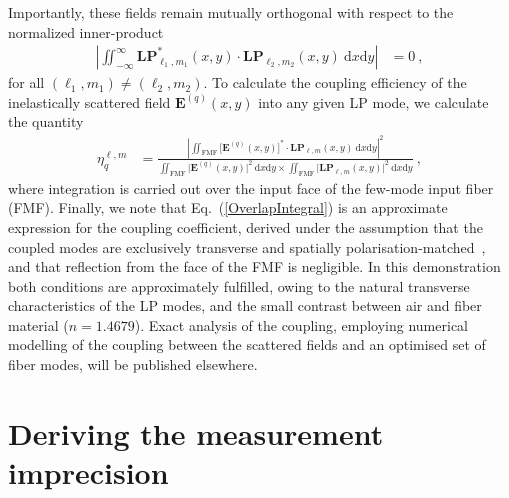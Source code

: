 \documentclass[%
 reprint,
 amsmath,amssymb,
 aps,
pra,
]{revtex4-2}
\begin{document}
Importantly, these fields remain mutually orthogonal with respect to the normalized inner-product
\begin{align}\label{SpatialOverlapIntegral}
    \left|\iint_{-\infty}^{\infty} \textbf{LP}_{\ell_{1}, m_{1}}^{*}(x, y) \cdot \textbf{LP}_{\ell_{2}, m_{2}}(x, y) ~ \mathrm{d}x\mathrm{d}y\right| &= 0 ~ , 
\end{align}
for all $(\ell_{1}, m_{1}) \neq (\ell_{2}, m_{2})$. To calculate the coupling efficiency of the inelastically scattered field $\boldsymbol{E}^{(q)}(x, y)$ into any given LP mode, we calculate the quantity
\begin{align}\label{OverlapIntegral}
    \eta_{q}^{\ell,m} &= \frac{\left| \iint_{\mathrm{FMF}} \big[\boldsymbol{E}^{(q)}(x, y)\big]^{*} \cdot \textbf{LP}_{\ell, m}(x,y) ~ \mathrm{d}x\mathrm{d}y \right|^2}{\iint_{\mathrm{FMF}} \big|\boldsymbol{E}^{(q)}(x, y)\big|^{2}~\mathrm{d}x\mathrm{d}y \times \iint_{\mathrm{FMF}} \big|\textbf{LP}_{\ell, m}(x,y)\big|^{2}~\mathrm{d}x\mathrm{d}y} ~ ,
\end{align}
where integration is carried out over the input face of the few-mode input fiber (FMF). Finally, we note that Eq.~(\ref{OverlapIntegral}) is an approximate expression for the coupling coefficient, derived under the assumption that the coupled modes are exclusively transverse and spatially polarisation-matched~\cite{wagner_coupling_1982}, and that reflection from the face of the FMF is negligible. In this demonstration both conditions are approximately fulfilled, owing to the natural transverse characteristics of the LP modes, and the small contrast between air and fiber material ($n= 1.4679$). Exact analysis of the coupling, employing numerical modelling of the coupling between the scattered fields and an optimised set of fiber modes, will be published elsewhere.

\section{Deriving the measurement imprecision}\label{sec:MeasurementImp}
\end{document}
